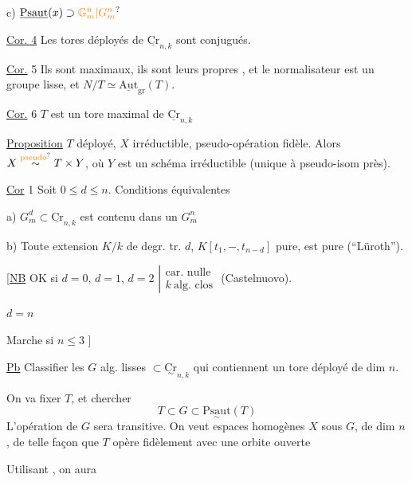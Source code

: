 c) $\underline{\mathrm{Psaut}}(x)\supset\unsure{\mathbb G_m^n|G_m^n}$

\uline{Cor. 4} Les tores déployés  de $\underline{\mathrm{Cr}}_{n,k}$ sont conjugués.

\uline{Cor.} 5 Ils sont maximaux, ils sont leurs propres , et le normalisateur est un groupe  lisse, et $N/T\simeq\underline{\mathrm{Aut}}_{\mathrm{gr}}(T)$.

\uline{Cor.} 6 $T$ est un tore maximal de $\underline{\mathrm{Cr}}_{n,k}$

\uline{Proposition} $T$ déployé, $X$ irréductible, pseudo-opération fidèle. Alors $X\overset{\text{\unsure{pseudo}}}{\sim}T\times Y$, où $Y$ est un schéma irréductible (unique à pseudo-isom près).

\uline{Cor} 1 Soit $0\leq d\leq n$. Conditions équivalentes

a)  $G_m^d\subset\underline{\mathrm{Cr}}_{n,k}$ est contenu dans un $G_m^n$

b) Toute extension $K/k$ de degr. tr. $d$,  $K[t_1,-,t_{n-d}]$ pure, est pure (``Lüroth'').

[\uline{NB} \quad OK si $d=0$, $d=1$, $d=2$ $\left|\begin{array}{l}\text{car. nulle}\\ k\ \text{alg. clos}\end{array}\right.$ (Castelnuovo).

\hspace*{4em}$d=n$

Marche si $n\leq 3$ \quad ]

\uline{Pb} Classifier les $G$ alg. lisses $\subset\underset{\sim}{\mathrm{Cr}}_{n,k}$ qui contiennent un tore déployé de dim $n$.

\uline{}

On va fixer $T$, et chercher
\[
T\subset G\subset\underset{\sim}{\mathrm{Psaut}}(T)
\]
L'opération de $G$ sera transitive. On veut espaces homogènes $X$ sous $G$, de dim $n$, de telle façon que $T$ opère fidèlement avec une orbite ouverte

Utilisant , on aura



